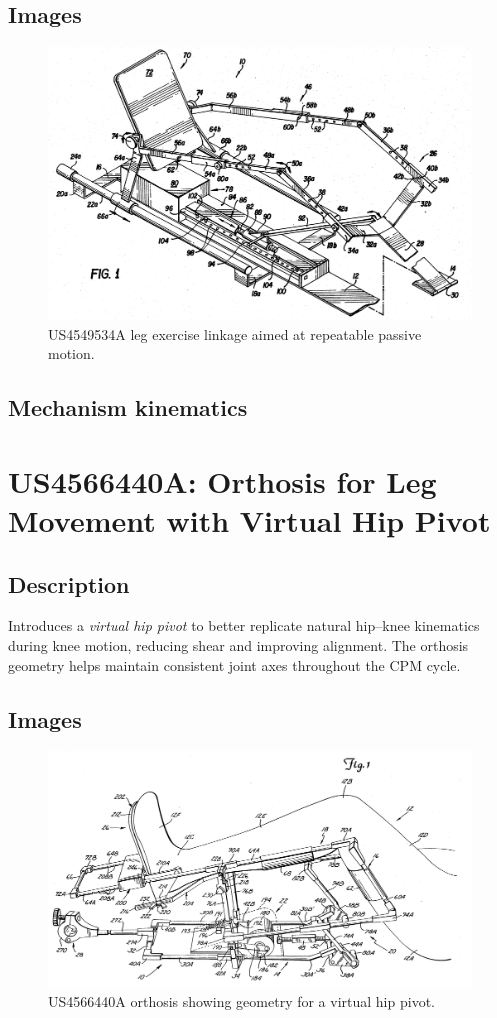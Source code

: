\documentclass[11pt]{article}
\begin{document}
\subsection{Images}
\begin{figure}[H]
  \centering
  \includegraphics[width=0.54\linewidth]{US4549534.png}
  \caption{US4549534A leg exercise linkage aimed at repeatable passive motion.}
  \label{fig:US4549534A}
\end{figure}

\subsection{Mechanism kinematics}

\section{US4566440A: Orthosis for Leg Movement with Virtual Hip Pivot}
\subsection{Description}
Introduces a \emph{virtual hip pivot} to better replicate natural hip–knee kinematics during knee motion, reducing shear and improving alignment. The orthosis geometry helps maintain consistent joint axes throughout the CPM cycle.
\subsection{Images}
\begin{figure}[H]
  \centering
  \includegraphics[width=0.54\linewidth]{US4566440_1.png}
  \caption{US4566440A orthosis showing geometry for a virtual hip pivot.}
  \label{fig:US4566440A}
\end{figure}
\end{document}
